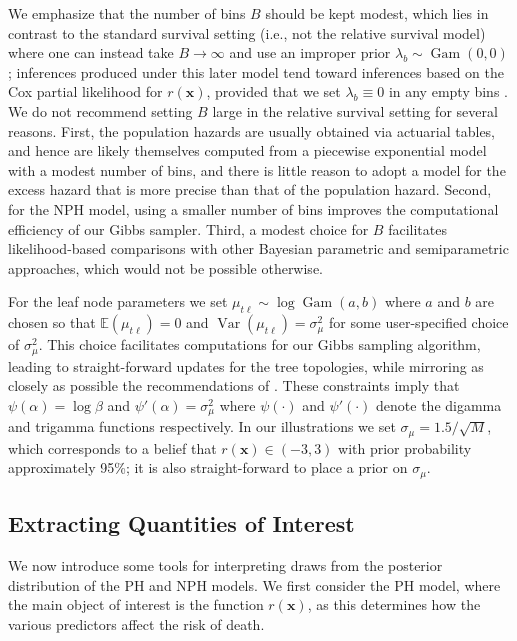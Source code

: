 \documentclass[12pt]{article}
\newcommand{\E}{\mathbb E}
\newcommand{\Gam}{\operatorname{Gam}}
\newcommand{\Var}{\operatorname{Var}}
\newcommand{\bx}{\mathbf{x}}
\begin{document}
We emphasize that the number of bins $B$ should be kept modest, which lies in contrast to the standard survival setting (i.e., not the relative survival model) where one can instead take $B \to \infty$ and use an improper prior $\lambda_b \sim \Gam(0, 0)$; inferences produced under this later model tend toward inferences based on the Cox partial likelihood for $r(\bx)$, provided that we set $\lambda_b \equiv 0$ in any empty bins \citep{sinha2003bayesian}. We do not recommend setting $B$ large in the relative survival setting for several reasons. First, the population hazards are usually obtained via actuarial tables, and hence are likely themselves computed from a piecewise exponential model with a modest number of bins, and there is little reason to adopt a model for the excess hazard that is more precise than that of the population hazard. Second, for the NPH model, using a smaller number of bins improves the computational efficiency of our Gibbs sampler. Third, a modest choice for $B$ facilitates likelihood-based comparisons with other Bayesian parametric and semiparametric approaches, which would not be possible otherwise.

For the leaf node parameters we set $\mu_{t\ell} \sim \log \Gam(a, b)$ where $a$ and $b$ are chosen so that $\E(\mu_{t\ell}) = 0$ and $\Var(\mu_{t\ell}) = \sigma^2_\mu$ for some user-specified choice of $\sigma^2_\mu$. This choice facilitates computations for our Gibbs sampling algorithm, leading to straight-forward updates for the tree topologies, while mirroring as closely as possible the recommendations of \citet{chipman2010bart}. These constraints imply that $\psi(\alpha) = \log \beta$ and $\psi'(\alpha) = \sigma^2_\mu$ where $\psi(\cdot)$ and $\psi'(\cdot)$ denote the digamma and trigamma functions respectively. In our illustrations we set $\sigma_\mu = 1.5 / \sqrt{M}$, which corresponds to a belief that $r(\bx) \in (-3, 3)$ with prior probability approximately 95\%; it is also straight-forward to place a prior on $\sigma_\mu$.

\subsection{Extracting Quantities of Interest}

We now introduce some tools for interpreting draws from the posterior distribution of the PH and NPH models. We first consider the PH model, where the main object of interest is the function $r(\bx)$, as this determines how the various predictors affect the risk of death. 
\end{document}
